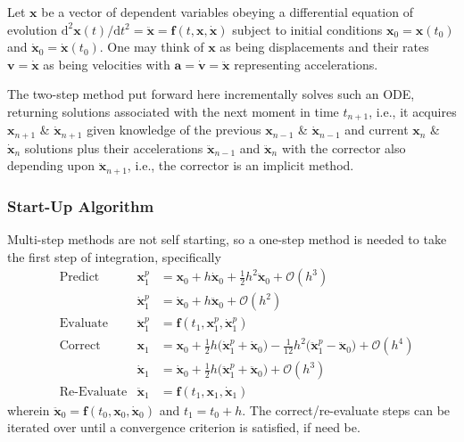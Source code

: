 Let $\mathbf{x}$ be a vector of dependent variables obeying a differential equation of evolution $\mathrm{d}^2 \mathbf{x}(t) / \mathrm{d} t^2 = \ddot{\mathbf{x}} = \mathbf{f} (t, \mathbf{x}, \dot{\mathbf{x}})$ subject to initial conditions $\mathbf{x}_0 = \mathbf{x}(t_0)$ and $\dot{\mathbf{x}}_0 = \dot{\mathbf{x}}(t_0)$.  One may think of $\mathbf{x}$ as being displacements and their rates $\mathbf{v} = \dot{\mathbf{x}}$ as being velocities with $\mathbf{a} = \dot{\mathbf{v}} = \ddot{\mathbf{x}}$ representing accelerations. 

The two-step method put forward here incrementally solves such an ODE, returning solutions associated with the next moment in time $t_{n+1}$, i.e., it acquires $\mathbf{x}_{n+1}$ \& $\dot{\mathbf{x}}_{n+1}$ given knowledge of the previous $\mathbf{x}_{n-1}$ \& $\dot{\mathbf{x}}_{n-1}$ and current $\mathbf{x}_n$ \& $\dot{\mathbf{x}}_n$ solutions plus their accelerations $\ddot{\mathbf{x}}_{n-1}$ and $\ddot{\mathbf{x}}_n$ with the corrector also depending upon $\ddot{\mathbf{x}}_{n+1}$, i.e., the corrector is an implicit method.

\subsubsection{Start-Up Algorithm}

Multi-step methods are not self starting, so a one-step method is needed to take the first step of integration, specifically
\begin{subequations}
    \label{pairedStartUp}
    \begin{align}
    \mbox{} & \text{Predict} & 
    \mathbf{x}_1^p & = \mathbf{x}_0 + h \dot{\mathbf{x}}_0 +
    \tfrac{1}{2} h^2 \ddot{\mathbf{x}}_0 + \mathcal{O} (h^3) 
    \label{startupDisplacementPredictor} \\
    \mbox{} & &
    \dot{\mathbf{x}}^p_1 & = \dot{\mathbf{x}}_0 + h \ddot{\mathbf{x}}_0 + 
    \mathcal{O} (h^2) 
    \label{startUpVelocityPredictor} \\
    \mbox{} & \text{Evaluate} &
    \ddot{\mathbf{x}}^p_1 & = \mathbf{f} (t_1, \mathbf{x}^p_1, \dot{\mathbf{x}}^p_1)
    \label{startUpEvaluate} \\
    \mbox{} & \text{Correct} &
    \mathbf{x}_1 & = \mathbf{x}_0 + \tfrac{1}{2} h 
    \bigl( \dot{\mathbf{x}}^p_1 + \dot{\mathbf{x}}_0 \bigr) -
    \tfrac{1}{12} h^2 \bigl( \ddot{\mathbf{x}}^p_1 - 
    \ddot{\mathbf{x}}_0 \bigr) + \mathcal{O} (h^4) 
    \label{startupDisplacementCorrector} \\
    \mbox{} & &
    \dot{\mathbf{x}}_1 & = \dot{\mathbf{x}}_0 + \tfrac{1}{2} h 
    \bigl( \ddot{\mathbf{x}}_1^p + \ddot{\mathbf{x}}_0 \bigr) + 
    \mathcal{O} (h^3)
    \label{startUpVelocityCorrector} \\
    \mbox{} & \text{Re-Evaluate} &
    \ddot{\mathbf{x}}_1 & = \mathbf{f} (t_1, \mathbf{x}_1, \dot{\mathbf{x}}_1) 
    \label{startUpReEvaluate}
    \end{align}
\end{subequations}
wherein $\ddot{\mathbf{x}}_0 = \mathbf{f}(t_0, \mathbf{x}_0, \dot{\mathbf{x}}_0)$ and $t_1 = t_0 + h$.  The correct\slash re-evaluate steps can be iterated over until a convergence criterion is satisfied, if need be.


